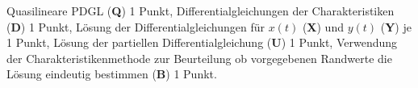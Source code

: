 \begin{bewertung}
Quasilineare PDGL ({\bf Q}) 1 Punkt,
Differentialgleichungen der Charakteristiken ({\bf D}) 1 Punkt,
Lösung der Differentialgleichungen für $x(t)$ ({\bf X})
und $y(t)$ ({\bf Y}) je 1 Punkt,
Lösung der partiellen Differentialgleichung ({\bf U}) 1 Punkt,
Verwendung der Charakteristikenmethode zur Beurteilung ob
vorgegebenen Randwerte die Lösung eindeutig bestimmen ({\bf B}) 1 Punkt.
\end{bewertung}

